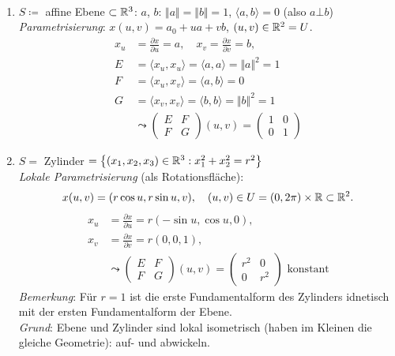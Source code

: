 \begin{example}
  \
  \begin{enumerate}
    \item $ S \coloneqq $ affine Ebene $ \subset \mathbb{R}^3 $: $ a $, $ b $: $ \Vert a \Vert = \Vert b \Vert = 1 $, $ \langle a, b \rangle = 0 $ (also $ a \bot b $) \\
    \emph{Parametrisierung}: $ x(u,v) = a_0 + ua + vb $, $ (u,v) \in \mathbb{R}^2 = U $.
    \begin{align*}
      x_u &= \frac{\partial x}{\partial u} = a, \quad x_v = \frac{\partial x}{\partial v} = b\text{,} \\
      E &= \langle x_u, x_u \rangle = \langle a, a \rangle = \Vert a \Vert^2 = 1 \\
      F &= \langle x_u, x_v \rangle = \langle a, b \rangle = 0 \\
      G &= \langle x_v, x_v \rangle = \langle b, b \rangle = \Vert b \Vert^2 = 1 \\
      &\leadsto \begin{pmatrix}
        E & F \\
        F & G
      \end{pmatrix}(u,v) = \begin{pmatrix}
        1 & 0 \\
        0 & 1
      \end{pmatrix}
    \end{align*}
    \item $ S = $ Zylinder $ = \left\{ (x_1, x_2, x_3) \in \mathbb{R}^3 : x_1^2+x_2^2 = r^2 \right\} $ \\
    \emph{Lokale Parametrisierung} (als Rotationsfläche):
    \begin{equation*}
      x(u,v) = (r \cos u, r \sin u, v), \quad (u,v) \in U = (0,2\pi) \times \mathbb{R} \subset \mathbb{R}^2\text{.}
    \end{equation*}
    \begin{align*}
      x_u &= \frac{\partial x}{\partial u} = r(-\sin u, \cos u, 0)\text{,} \\
      x_v &= \frac{\partial x}{\partial v} = r(0,0,1)\text{,} \\
        &\leadsto \begin{pmatrix}
          E & F \\
          F & G
        \end{pmatrix}(u,v) = \begin{pmatrix}
          r^2 & 0 \\
          0 & r^2
        \end{pmatrix} \text{ konstant}
    \end{align*}
    \emph{Bemerkung}: Für $ r = 1 $ ist die erste Fundamentalform des Zylinders idnetisch mit der ersten Fundamentalform der Ebene. \\
    \emph{Grund}: Ebene und Zylinder sind lokal isometrisch (haben im Kleinen die gleiche Geometrie): auf- und abwickeln.
  \end{enumerate}
\end{example}